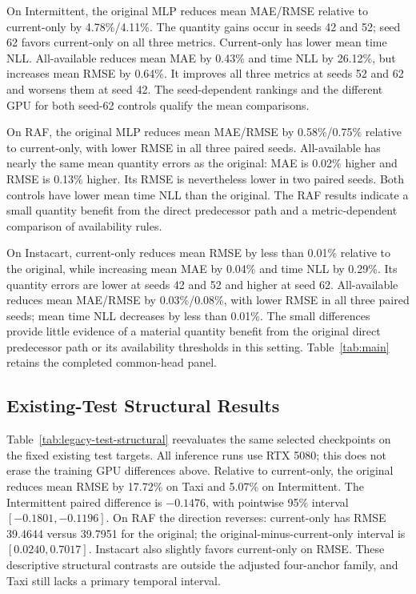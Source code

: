 \documentclass[runningheads]{llncs}
\begin{document}
On Intermittent, the original MLP reduces mean MAE/RMSE relative to
current-only by 4.78\%/4.11\%. The quantity gains occur in seeds 42 and 52;
seed 62 favors current-only on all three metrics. Current-only has lower
mean time NLL. All-available reduces mean MAE by 0.43\% and time NLL by
26.12\%, but increases mean RMSE by 0.64\%. It improves all three metrics
at seeds 52 and 62 and worsens them at seed 42. The seed-dependent rankings
and the different GPU for both seed-62 controls qualify the mean comparisons.

On RAF, the original MLP reduces mean MAE/RMSE by 0.58\%/0.75\% relative
to current-only, with lower RMSE in all three paired seeds. All-available
has nearly the same mean quantity errors as the original: MAE is 0.02\%
higher and RMSE is 0.13\% higher. Its RMSE is nevertheless lower in two
paired seeds. Both controls have lower mean time NLL than the original.
The RAF results indicate a small quantity benefit from the direct
predecessor path and a metric-dependent comparison of availability rules.

On Instacart, current-only reduces mean RMSE by less than 0.01\% relative
to the original, while increasing mean MAE by 0.04\% and time NLL by 0.29\%.
Its quantity errors are lower at seeds 42 and 52 and higher at seed 62.
All-available reduces mean MAE/RMSE by 0.03\%/0.08\%, with lower RMSE in all
three paired seeds; mean time NLL decreases by less than 0.01\%.
The small differences provide little evidence of a material quantity benefit
from the original direct predecessor path or its availability thresholds in
this setting. Table~\ref{tab:main} retains the completed common-head panel.


\subsection{Existing-Test Structural Results}
Table~\ref{tab:legacy-test-structural} reevaluates the same selected
checkpoints on the fixed existing test targets. All inference runs use
RTX 5080; this does not erase the training GPU differences above.
Relative to current-only, the original reduces mean RMSE by 17.72\%
on Taxi and 5.07\% on Intermittent. The Intermittent paired difference is
$-0.1476$, with pointwise 95\% interval $[-0.1801,-0.1196]$.
On RAF the direction reverses: current-only has RMSE 39.4644 versus
39.7951 for the original; the original-minus-current-only interval is
$[0.0240,0.7017]$. Instacart also slightly favors current-only on RMSE.
These descriptive structural contrasts are outside the adjusted four-anchor
family, and Taxi still lacks a primary temporal interval.
\end{document}
